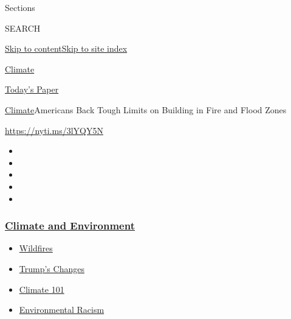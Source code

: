 Sections

SEARCH

\protect\hyperlink{site-content}{Skip to
content}\protect\hyperlink{site-index}{Skip to site index}

\href{https://www.nytimes3xbfgragh.onion/section/climate}{Climate}

\href{https://myaccount.nytimes3xbfgragh.onion/auth/login?response_type=cookie\&client_id=vi}{}

\href{https://www.nytimes3xbfgragh.onion/section/todayspaper}{Today's
Paper}

\href{/section/climate}{Climate}\textbar{}Americans Back Tough Limits on
Building in Fire and Flood Zones

\url{https://nyti.ms/3lYQY5N}

\begin{itemize}
\item
\item
\item
\item
\item
\end{itemize}

\hypertarget{climate-and-environment}{%
\subsubsection{\texorpdfstring{\href{https://www.nytimes3xbfgragh.onion/section/climate?name=styln-climate\&region=TOP_BANNER\&block=storyline_menu_recirc\&action=click\&pgtype=Article\&impression_id=72e5d120-f4c5-11ea-8643-75abe867ee48\&variant=undefined}{Climate
and
Environment}}{Climate and Environment}}\label{climate-and-environment}}

\begin{itemize}
\tightlist
\item
  \href{https://www.nytimes3xbfgragh.onion/2020/09/08/climate/california-wildfires-climate.html?name=styln-climate\&region=TOP_BANNER\&block=storyline_menu_recirc\&action=click\&pgtype=Article\&impression_id=72e5d121-f4c5-11ea-8643-75abe867ee48\&variant=undefined}{Wildfires}
\item
  \href{https://www.nytimes3xbfgragh.onion/interactive/2020/climate/trump-environment-rollbacks.html?name=styln-climate\&region=TOP_BANNER\&block=storyline_menu_recirc\&action=click\&pgtype=Article\&impression_id=72e5f830-f4c5-11ea-8643-75abe867ee48\&variant=undefined}{Trump's
  Changes}
\item
  \href{https://www.nytimes3xbfgragh.onion/interactive/2020/04/19/climate/climate-crash-course-1.html?name=styln-climate\&region=TOP_BANNER\&block=storyline_menu_recirc\&action=click\&pgtype=Article\&impression_id=72e5f831-f4c5-11ea-8643-75abe867ee48\&variant=undefined}{Climate
  101}
\item
  \href{https://www.nytimes3xbfgragh.onion/interactive/2020/08/24/climate/racism-redlining-cities-global-warming.html?name=styln-climate\&region=TOP_BANNER\&block=storyline_menu_recirc\&action=click\&pgtype=Article\&impression_id=72e5f832-f4c5-11ea-8643-75abe867ee48\&variant=undefined}{Environmental
  Racism}
\end{itemize}

